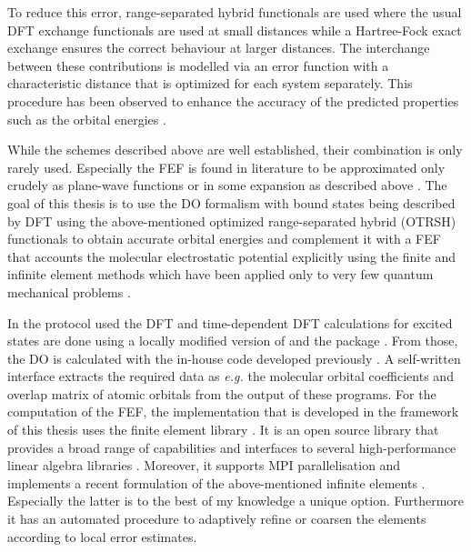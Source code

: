 To reduce this error, range-separated hybrid functionals are used where the usual DFT exchange functionals are used at small distances while a Hartree-Fock exact exchange ensures the correct behaviour at larger distances.
The interchange between these contributions is modelled via an error function with a characteristic distance that is optimized for each system separately.
This procedure has been observed to enhance the accuracy of the predicted properties such as the orbital energies \cite{Bokareva,GrellKuehn, Gerber, Gerber2}.

While the schemes described above are well established, their combination is only rarely used.
Especially the FEF is found in literature to be approximated only crudely as plane-wave functions \cite{planeWave} or in some expansion as described above \cite{ezDyson,MAgg,GrellKuehn}.
The goal of this thesis is to use the DO formalism with bound states being described by DFT using the above-mentioned optimized range-separated hybrid (OTRSH) functionals to obtain accurate orbital energies and complement it with a FEF that accounts the molecular electrostatic potential explicitly using the finite and infinite element methods which have been applied only to very few quantum mechanical problems \cite{sobaMolecule,bettessHarmonic}.

In the protocol used the DFT and time-dependent DFT calculations for excited states are done using a locally modified version of  \cite{nwchem} and the  package \cite{g09}.
From those, the DO is calculated with the in-house code  developed previously \cite{MAgg}.
A self-written interface extracts the required data as \textit{e.g.} the molecular orbital coefficients and overlap matrix of atomic orbitals from the output of these programs.
For the computation of the FEF, the implementation that is developed in the framework of this thesis uses the finite element library  \cite{libmesh}. 
It is an open source library that provides a broad range of capabilities and interfaces to several high-performance linear algebra libraries \cite{slepc1,slepc2,petsc}.
Moreover, it supports MPI parallelisation and implements a recent formulation of the above-mentioned infinite elements \cite{dreyer}.
Especially the latter is to the best of my knowledge a unique option.
Furthermore it has an automated procedure to adaptively refine or coarsen the elements according to local error estimates.

